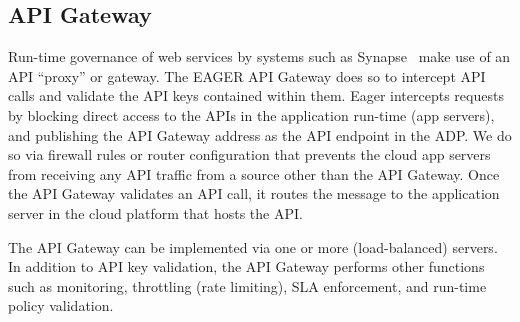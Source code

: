 \subsection{API Gateway} 
Run-time governance of web services by systems such as
Synapse~\cite{synapse} make use of an API ``proxy'' or gateway.
The EAGER API Gateway does so to intercept API calls and validate 
the API keys contained within them.
Eager intercepts requests by blocking direct access to the APIs in the
application run-time (app servers), and publishing the API Gateway address as
the API endpoint in the ADP. We do so via firewall rules
or router configuration that prevents the cloud app servers from receiving any
API traffic from a source other than the API Gateway. Once the API Gateway validates
an API call, it routes the message to the
application server in the cloud platform that hosts the API.

The API Gateway can be implemented via one or more (load-balanced) servers.
In addition to API key validation, the API Gateway performs other
functions such as monitoring, throttling (rate limiting), SLA
enforcement, and run-time policy validation. 
